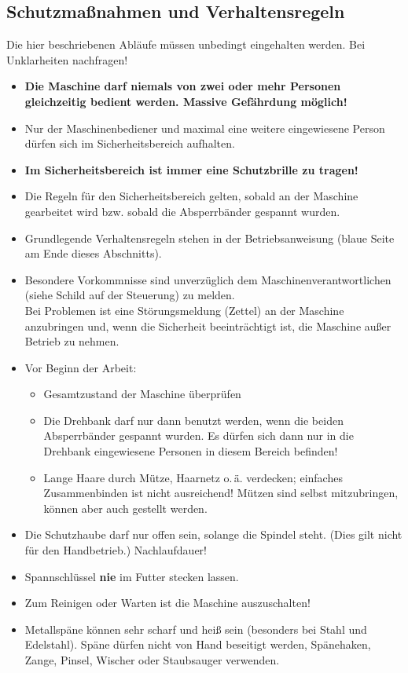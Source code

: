 \documentclass{\basedir/fablab-document}
\begin{document}
\subsection{Schutzmaßnahmen und Verhaltensregeln}
Die hier beschriebenen Abläufe müssen unbedingt eingehalten werden.
Bei Unklarheiten nachfragen!
\begin{itemize}
\item \textbf{Die Maschine darf niemals von zwei oder mehr Personen gleichzeitig bedient werden. Massive Gefährdung möglich!}
\item Nur der Maschinenbediener und maximal eine weitere eingewiesene Person dürfen sich im Sicherheitsbereich aufhalten.\\
\item \textbf{Im Sicherheitsbereich ist immer eine Schutzbrille zu tragen!}
\item Die Regeln für den Sicherheitsbereich gelten, sobald an der Maschine gearbeitet wird bzw. sobald die Absperrbänder gespannt wurden.
\item Grundlegende Verhaltensregeln stehen in der Betriebsanweisung (blaue Seite am Ende dieses Abschnitts).
\item Besondere Vorkommnisse sind unverzüglich dem Maschinenverantwortlichen (siehe Schild auf der Steuerung) zu melden.\\
Bei Problemen ist eine Störungsmeldung (Zettel) an der Maschine anzubringen und, wenn die Sicherheit beeinträchtigt ist, die Maschine außer Betrieb zu nehmen.

\item Vor Beginn der Arbeit:
\begin{itemize}
\item Gesamtzustand der Maschine überprüfen
\item Die Drehbank darf nur dann benutzt werden, wenn die beiden Absperrbänder gespannt wurden. Es dürfen sich dann nur in die Drehbank eingewiesene Personen in diesem Bereich befinden!
\item Lange Haare durch Mütze, Haarnetz o.\,ä. verdecken; einfaches Zusammenbinden ist nicht ausreichend! Mützen sind selbst mitzubringen, können aber auch gestellt werden.
\end{itemize}

 \item Die Schutzhaube darf nur offen sein, solange die Spindel steht. (Dies gilt nicht für den Handbetrieb.) Nachlaufdauer!  %
 \item Spannschlüssel \textbf{nie} im Futter stecken lassen. %
 \item Zum Reinigen oder Warten ist die Maschine auszuschalten!
 \item Metallspäne können sehr scharf und heiß sein (besonders bei Stahl und Edelstahl). Späne dürfen nicht von Hand beseitigt werden, Spänehaken, Zange, Pinsel, Wischer oder Staubsauger verwenden. %


\end{itemize}
\end{document}
